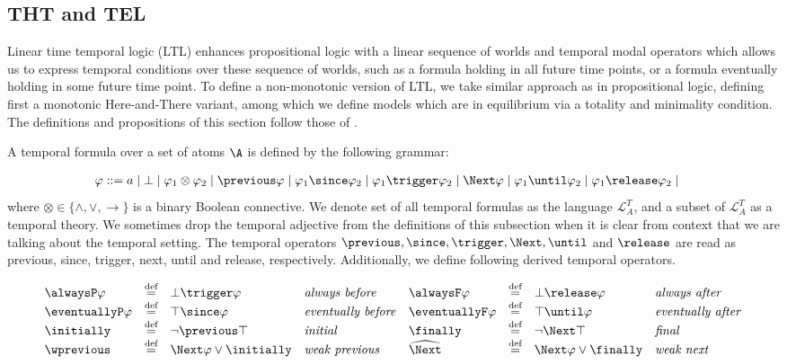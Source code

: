 \subsection{THT and TEL}

Linear time temporal logic (LTL) enhances propositional logic with a
linear sequence of worlds and temporal modal operators which allows us
to express temporal conditions over these sequence of worlds, such as
a formula holding in all future time points, or a formula eventually
holding in some future time point. To define a non-monotonic version
of LTL, we take similar approach as in propositional logic, defining
first a monotonic Here-and-There variant, among which we define models
which are in equilibrium via a totality and minimality condition. The
definitions and propositions of this section follow those of
\cite{agcadipescscvi20a}.

A temporal formula over a set of atoms $\A$ is defined by the
following grammar:

\begin{align*}
    \varphi ::= &\; a \mid \bot \mid
                  \varphi_1 \otimes \varphi_2 \mid
                  \previous \varphi \mid \varphi_1 \since \varphi_2 \mid \varphi_1 \trigger \varphi_2 \mid
                  \Next \varphi \mid \varphi_1 \until \varphi_2 \mid \varphi_1 \release \varphi_2 \mid                  
\end{align*}
where $\otimes \in \{ \wedge, \vee, \to \}$ is a binary Boolean
connective. We denote set of all temporal formulas as the language
$\mathcal{L}_{A}^{T}$, and a subset of $\mathcal{L}_{A}^{T}$ as a
temporal theory. We sometimes drop the temporal adjective from the
definitions of this subsection when it is clear from context that we
are talking about the temporal setting. The temporal operators
$\previous, \since, \trigger, \Next, \until$ and $\release$ are read as
previous, since, trigger, next, until and release,
respectively. Additionally, we define following derived temporal
operators.

\[
\begin{array}{l l l l l l l l}
\alwaysP \varphi & \defeq & \bot \trigger \varphi & \text{\emph{always before}} &
\alwaysF \varphi & \defeq & \bot \release \varphi & \text{\emph{always after}} \\
\eventuallyP \varphi & \defeq & \top \since \varphi & \text{\emph{eventually before}} &
\eventuallyF \varphi & \defeq & \top \until \varphi & \text{\emph{eventually after}} \\
\initially & \defeq & \lnot \previous \top & \text{\emph{initial}} &
\finally & \defeq & \lnot \Next \top & \text{\emph{final}} \\
\wprevious & \defeq & \Next \varphi \vee \initially & \text{\emph{weak previous}} &
\wnext & \defeq & \Next \varphi \vee \finally & \text{\emph{weak next}}
\end{array}
\]

